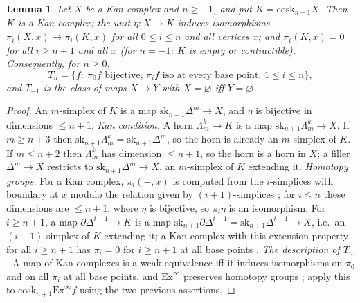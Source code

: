 \documentclass[11pt]{amsart}
\newtheorem{lem}[thm]{Lemma}
\theoremstyle{definition}
\newcommand{\cosk}{\mathrm{cosk}}
\newcommand{\sk}{\mathrm{sk}}
\begin{document}
\begin{lem}\label{lem:cosk}
Let $X$ be a Kan complex and $n\ge-1$, and put $K=\cosk_{n+1}X$. Then $K$ is
a Kan complex; the unit $\eta\colon X\to K$ induces isomorphisms
$\pi_i(X,x)\to\pi_i(K,x)$ for all $0\le i\le n$ and all vertices $x$; and
$\pi_i(K,x)=0$ for all $i\ge n+1$ and all $x$ (for $n=-1$: $K$ is empty or
contractible). Consequently, for $n\ge0$,
\[
T_n=\{f:\ \pi_0f\text{ bijective, }\pi_if\text{ iso at every base point, }1\le i\le n\},
\]
and $T_{-1}$ is the class of maps $X\to Y$ with $X=\varnothing$ iff
$Y=\varnothing$.
\end{lem}
\begin{proof}
An $m$-simplex of $K$ is a map $\sk_{n+1}\Delta^m\to X$, and $\eta$ is
bijective in dimensions $\le n+1$. \emph{Kan condition.} A horn
$\Lambda^k_m\to K$ is a map $\sk_{n+1}\Lambda^k_m\to X$. If $m\ge n+3$ then
$\sk_{n+1}\Lambda^k_m=\sk_{n+1}\Delta^m$, so the horn is already an
$m$-simplex of $K$. If $m\le n+2$ then $\Lambda^k_m$ has dimension $\le n+1$,
so the horn is a horn in $X$; a filler $\Delta^m\to X$ restricts to
$\sk_{n+1}\Delta^m\to X$, an $m$-simplex of $K$ extending it.
\emph{Homotopy groups.} For a Kan complex, $\pi_i(-,x)$ is computed from the
$i$-simplices with boundary at $x$ modulo the relation given by
$(i{+}1)$-simplices \cite[I.7]{GJ}; for $i\le n$ these dimensions are
$\le n+1$, where $\eta$ is bijective, so $\pi_i\eta$ is an isomorphism.
For $i\ge n+1$, a map $\partial\Delta^{i+1}\to K$ is a map
$\sk_{n+1}\partial\Delta^{i+1}=\sk_{n+1}\Delta^{i+1}\to X$, i.e.\ an
$(i{+}1)$-simplex of $K$ extending it; a Kan complex with this extension
property for all $i\ge n+1$ has $\pi_i=0$ for $i\ge n+1$ at all base points
\cite[I.7]{GJ}. \emph{The description of $T_n$.} A map of Kan complexes is a
weak equivalence iff it induces isomorphisms on $\pi_0$ and on all $\pi_i$
at all base points, and $\mathrm{Ex}^\infty$ preserves homotopy groups
\cite[III.4]{GJ}; apply this to $\cosk_{n+1}\mathrm{Ex}^\infty f$ using the
two previous assertions.
\end{proof}
\end{document}

